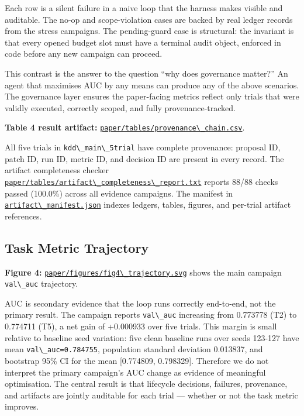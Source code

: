 Each row is a silent failure in a naive loop that the harness makes visible and auditable. The no-op and scope-violation cases are backed by real ledger records from the stress campaigns. The pending-guard case is structural: the invariant is that every opened budget slot must have a terminal audit object, enforced in code before any new campaign can proceed.

This contrast is the answer to the question ``why does governance matter?'' An agent that maximises AUC by any means can produce any of the above scenarios. The governance layer ensures the paper-facing metrics reflect only trials that were validly executed, correctly scoped, and fully provenance-tracked.

\textbf{Table 4 result artifact:} \href{../../tables/provenance_chain.csv}{\passthrough{\lstinline!paper/tables/provenance\_chain.csv!}}.

All five trials in \passthrough{\lstinline!kdd\_main\_5trial!} have complete provenance: proposal ID, patch ID, run ID, metric ID, and decision ID are present in every record. The artifact completeness checker \href{../../tables/artifact_completeness_report.txt}{\passthrough{\lstinline!paper/tables/artifact\_completeness\_report.txt!}} reports 88/88 checks passed (100.0\%) across all evidence campaigns. The manifest in \href{../../../artifact_manifest.json}{\passthrough{\lstinline!artifact\_manifest.json!}} indexes ledgers, tables, figures, and per-trial artifact references.

\subsection{Task Metric Trajectory}\label{task-metric-trajectory}

\textbf{Figure 4:} \href{../../figures/fig4_trajectory.svg}{\passthrough{\lstinline!paper/figures/fig4\_trajectory.svg!}} shows the main campaign \passthrough{\lstinline!val\_auc!} trajectory.

AUC is secondary evidence that the loop runs correctly end-to-end, not the primary result. The campaign reports \passthrough{\lstinline!val\_auc!} increasing from 0.773778 (T2) to 0.774711 (T5), a net gain of +0.000933 over five trials. This margin is small relative to baseline seed variation: five clean baseline runs over seeds 123-127 have mean \passthrough{\lstinline!val\_auc=0.784755!}, population standard deviation 0.013837, and bootstrap 95\% CI for the mean {[}0.774809, 0.798329{]}. Therefore we do not interpret the primary campaign's AUC change as evidence of meaningful optimisation. The central result is that lifecycle decisions, failures, provenance, and artifacts are jointly auditable for each trial --- whether or not the task metric improves.
